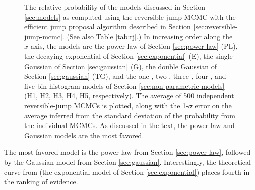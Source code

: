 \documentclass[preprint]{aastex}
\begin{document}
\begin{figure}
  \begin{center}
  \end{center}
  \caption{\label{fig:rj} The relative probability of the models
    discussed in Section \ref{sec:models} as computed using the
    reversible-jump MCMC with the efficient jump proposal algorithm
    described in Section \ref{sec:reversible-jump-mcmc}.  (See also
    Table \ref{tab:rj}.)  In increasing order along the $x$-axis, the
    models are the power-law of Section \ref{sec:power-law} (PL), the
    decaying exponential of Section \ref{sec:exponential} (E), the
    single Gaussian of Section \ref{sec:gaussian} (G), the double
    Gaussian of Section \ref{sec:gaussian} (TG), and the one-, two-,
    three-, four-, and five-bin histogram models of Section
    \ref{sec:non-parametric-models} (H1, H2, H3, H4, H5,
    respectively).  The average of 500 independent reversible-jump
    MCMCs is plotted, along with the 1-$\sigma$ error on the average
    inferred from the standard deviation of the probability from the
    individual MCMCs.  As discussed in the text, the power-law and
    Gaussian models are the most favored.}
\end{figure}

The most favored model is the power law from Section
\ref{sec:power-law}, followed by the Gaussian model from Section
\ref{sec:gaussian}.  Interestingly, the theoretical curve from
\citet{Fryer2001} (the exponential model of Section
\ref{sec:exponential}) places fourth in the ranking of evidence.
\end{document}
